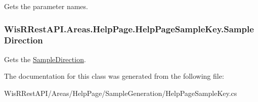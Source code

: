 Gets the parameter names. 

\hypertarget{class_wis_r_rest_a_p_i_1_1_areas_1_1_help_page_1_1_help_page_sample_key_a00e600712288edbcdf0a2930704b7534}{}
\subsubsection[{Sample\+Direction}]{ Wis\+R\+Rest\+A\+P\+I.\+Areas.\+Help\+Page.\+Help\+Page\+Sample\+Key.\+Sample\+Direction\hspace{0.3cm}{\ttfamily [get]}}\label{class_wis_r_rest_a_p_i_1_1_areas_1_1_help_page_1_1_help_page_sample_key_a00e600712288edbcdf0a2930704b7534}


Gets the \hyperlink{class_wis_r_rest_a_p_i_1_1_areas_1_1_help_page_1_1_help_page_sample_key_a00e600712288edbcdf0a2930704b7534}{Sample\+Direction}. 



The documentation for this class was generated from the following file\+:\begin{DoxyCompactItemize}
\item 
Wis\+R\+Rest\+A\+P\+I/\+Areas/\+Help\+Page/\+Sample\+Generation/Help\+Page\+Sample\+Key.\+cs\end{DoxyCompactItemize}
